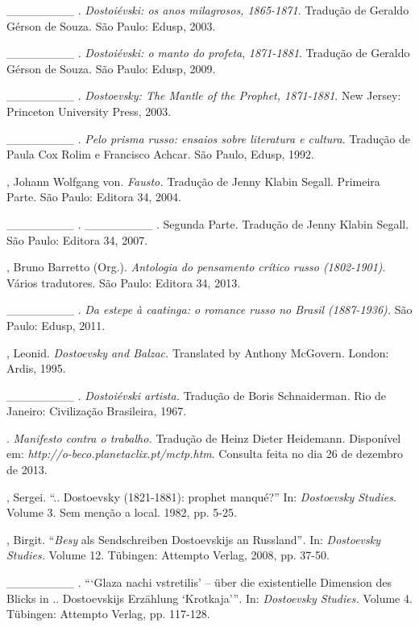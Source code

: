 \begin{Parskip}
\_\_\_\_\_\_\_\_ . \emph{Dostoiévski: os anos milagrosos, 1865-1871}.
Tradução de Geraldo Gérson de Souza. São Paulo: Edusp, 2003.

\_\_\_\_\_\_\_\_ . \emph{Dostoiévski: o manto do profeta},
\emph{1871-1881}. Tradução de Geraldo Gérson de Souza. São Paulo: Edusp,
2009.

\_\_\_\_\_\_\_\_ . \emph{Dostoevsky: The Mantle of the Prophet,
1871-1881}. New Jersey: Princeton University Press, 2003.

\_\_\_\_\_\_\_\_ . \emph{Pelo prisma russo: ensaios sobre literatura e
cultura}. Tradução de Paula Cox Rolim e Francisco Achcar. São Paulo,
Edusp, 1992.

, Johann Wolfgang von. \emph{Fausto.} Tradução de Jenny Klabin
Segall. Primeira Parte. São Paulo: Editora 34, 2004.

\_\_\_\_\_\_\_\_ . \_\_\_\_\_\_\_\_ . Segunda Parte. Tradução de Jenny
Klabin Segall. São Paulo: Editora 34, 2007.

, Bruno Barretto (Org.). \emph{Antologia do pensamento crítico
russo (1802-1901)}. Vários tradutores. São Paulo: Editora 34, 2013.

\_\_\_\_\_\_\_\_ . \emph{Da estepe à caatinga: o romance russo no Brasil
(1887-1936).} São Paulo: Edusp, 2011.

, Leonid. \emph{Dostoevsky and Balzac.} Translated by Anthony
McGovern. London: Ardis, 1995.

\_\_\_\_\_\_\_\_ . \emph{Dostoiévski artista.} Tradução de Boris
Schnaiderman. Rio de Janeiro: Civilização Brasileira, 1967.

 . \emph{Manifesto contra o trabalho.} Tradução de Heinz
Dieter Heidemann. Disponível em:
\emph{http://o-beco.planetaclix.pt/mctp.htm}.
Consulta feita no dia 26 de dezembro de 2013.

, Sergei. ``.. Dostoevsky (1821-1881): prophet manqué?'' In:
\emph{Dostoevsky Studies.} Volume 3. Sem menção a local. 1982, pp. 5-25.

, Birgit. ``\emph{Besy} als Sendschreiben Dostoevskijs an
Russland''\emph{.} In: \emph{Dostoevsky Studies.} Volume 12. Tübingen:
Attempto Verlag, 2008, pp. 37-50.

\_\_\_\_\_\_\_\_ . ```Glaza nachi vstretilis' -- über die existentielle
Dimension des Blicks in .. Dostoevskijs Erzählung `Krotkaja'''\emph{.}
In: \emph{Dostoevsky Studies.} Volume 4. Tübingen: Attempto Verlag, pp.
117-128.


\end{Parskip}
